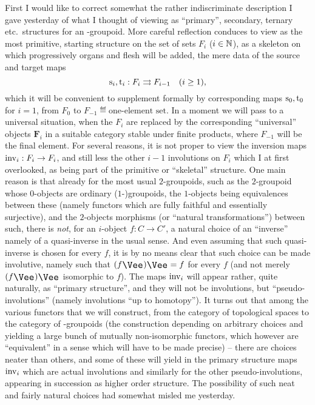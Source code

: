 \label{sec:4}%
First I would like to correct somewhat the rather indiscriminate
description I gave yesterday of what I thought of viewing as
``primary'', secondary, ternary etc.\ structures for an
\oo-groupoid. More careful reflection conduces to view as the most
primitive, starting structure on the set of sets $F_i$ ($i\in{\ensuremath{\mathbb{N}}}$), as
a skeleton on which progressively organs and flesh will be added, the
mere data of the source and target maps
\begin{equation*}
  \mathrm{s}_i, \mathrm{t}_i : F_i \rightrightarrows F_{i-1}
  \quad(i \ge 1),
\end{equation*}
which it will be convenient to supplement formally by corresponding
maps $\mathrm{s}_0, \mathrm{t}_0$ for $i=1$, from $F_0$ to
$F_{-1} \eqdef \text{one-element set}$. In a moment we will pass to a
universal situation, when the $F_i$ are replaced by the corresponding
``universal'' objects $\boldsymbol F_i$ in a suitable category stable
under finite products, where $F_{-1}$ will be the final element. For
several reasons, it is not proper to view the inversion maps
$\operatorname{inv}_i : F_i \to F_i$, and still less the other $i-1$ involutions on
$F_i$ which I at first overlooked, as being part of the primitive or
``skeletal'' structure. One main reason is that already for the most
usual $2$-groupoids, such as the $2$-groupoid whose $0$-objects are
ordinary ($1$-)groupoids, the $1$-objects being equivalences between
these (namely functors which are fully faithful and essentially
surjective), and the $2$-objects morphisms (or ``natural
transformations'') between such, there is \emph{not}, for an
$i$-object $f: C \to C'$, a natural choice of an ``inverse'' namely of
a quasi-inverse in the usual sense. And even assuming that such
quasi-inverse is chosen for every $f$, it is by no means clear that
such choice can be made involutive, namely such that
$(f\upvee)\upvee = f$ for every $f$ (and not merely $(f\upvee)\upvee$
isomorphic to $f$). The maps $\operatorname{inv}_i$ will appear rather, quite
naturally, as ``primary structure'', and they will not be involutions,
but ``pseudo-involutions'' (namely involutions ``up to homotopy''). It
turns out that among the various functors that we will construct, from
the category of topological spaces to the category of \oo-groupoids
(the construction depending on arbitrary choices and yielding a large
bunch of mutually non-isomorphic functors, which however are
``equivalent'' in a sense which will have to be made precise) -- there
are choices neater than others, and some of these will yield in the
primary structure maps $\operatorname{inv}_i$ which are actual involutions and
similarly for the other pseudo-involutions, appearing in succession as
higher order structure. The possibility of such neat and fairly
natural choices had somewhat misled me yesterday.

